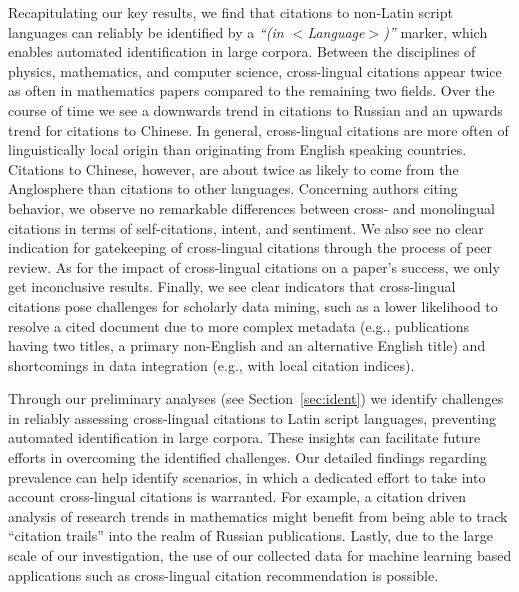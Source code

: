 Recapitulating our key results, we find that citations to non-Latin script languages can reliably be identified by a \textit{``(in $<$Language$>$)''} marker, which enables automated identification in large corpora. Between the disciplines of physics, mathematics, and computer science, cross-lingual citations appear twice as often in mathematics papers compared to the remaining two fields. Over the course of time we see a downwards trend in citations to Russian and an upwards trend for citations to Chinese. In general, cross-lingual citations are more often of linguistically local origin than originating from English speaking countries. Citations to Chinese, however, are about twice as likely to come from the Anglosphere than citations to other languages. Concerning authors citing behavior, we observe no remarkable differences between cross- and monolingual citations in terms of self-citations, intent, and sentiment. We also see no clear indication for gatekeeping of cross-lingual citations through the process of peer review. As for the impact of cross-lingual citations on a paper's success, we only get inconclusive results. Finally, we see clear indicators that cross-lingual citations pose challenges for scholarly data mining, such as a lower likelihood to resolve a cited document due to more complex metadata (e.g., publications having two titles, a primary non-English and an alternative English title) and shortcomings in data integration (e.g., with local citation indices).

Through our preliminary analyses (see Section~\ref{sec:ident}) we identify challenges in reliably assessing cross-lingual citations to Latin script languages, preventing automated identification in large corpora. These insights can facilitate future efforts in overcoming the identified challenges. Our detailed findings regarding prevalence can help identify scenarios, in which a dedicated effort to take into account cross-lingual citations is warranted. For example, a citation driven analysis of research trends in mathematics might benefit from being able to track ``citation trails'' into the realm of Russian publications. Lastly, due to the large scale of our investigation, the use of our collected data for machine learning based applications such as cross-lingual citation recommendation is possible.

